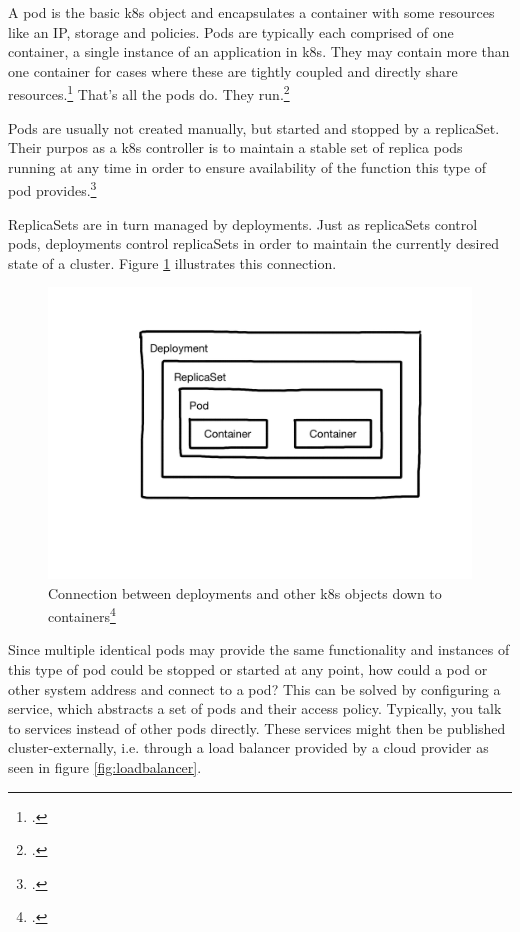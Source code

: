 A pod is the basic \gls{k8s} object and encapsulates a container with some resources like an IP, storage and policies. Pods are typically each comprised of one container, a single instance of an application in \gls{k8s}. They may contain more than one container for cases where these are tightly coupled and directly share resources.\footcite[][, section 'Understanding Pods']{k8sPods}
That's all the pods do. They run.\footcite[][p. 4]{phippy}

Pods are usually not created manually, but started and stopped by a replicaSet. Their purpos as a \gls{k8s} controller is to maintain a stable set of replica pods running at any time in order to ensure availability of the function this type of pod provides.\footcite[][, introductory sentence]{k8sReplicaSets}

ReplicaSets are in turn managed by deployments. Just as replicaSets control pods, deployments control replicaSets in order to maintain the currently desired state of a cluster.
Figure \ref{fig:k8s-deployments} illustrates this connection.

\begin{figure}
\includegraphics[scale=0.2]{pictures/deployment.JPG} 
\caption{Connection between deployments and other \gls{k8s} objects down to containers\protect\footcite{nicoPictures}}
\label{fig:k8s-deployments}
\end{figure}

Since multiple identical pods may provide the same functionality and instances of this type of pod could be stopped or started at any point, how could a pod or other system address and connect to a pod? This can be solved by configuring a service, which abstracts a set of pods and their access policy. Typically, you talk to services instead of other pods directly. These services might then be published cluster-externally, i.e. through a load balancer provided by a cloud provider as seen in figure \ref{fig:loadbalancer}.

